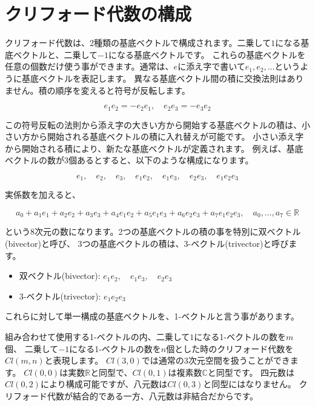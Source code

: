 \documentclass[a4paper,12pt,notitlepage]{jsreport}
\begin{document}
\section{クリフォード代数の構成}

クリフォード代数は、2種類の基底ベクトルで構成されます。二乗して$1$になる基底ベクトルと、二乗して$-1$になる基底ベクトルです。
これらの基底ベクトルを任意の個数だけ使う事ができます。通常は、$e$に添え字で書いて$e_1, e_2, ...$というように基底ベクトルを表記します。
異なる基底ベクトル間の積に交換法則はありません。積の順序を変えると符号が反転します。

\begin{equation}
  e_1e_2=-e_2e_1,\quad e_2e_3=-e_3e_2
\end{equation}

この符号反転の法則から添え字の大きい方から開始する基底ベクトルの積は、小さい方から開始される基底ベクトルの積に入れ替えが可能です。
小さい添え字から開始される積により、新たな基底ベクトルが定義されます。
例えば、基底ベクトルの数が3個あるとすると、以下のような構成になります。

\begin{equation}
  e_1,\quad e_2,\quad e_3,\quad e_1e_2,\quad e_1e_3,\quad e_2e_3,\quad e_1e_2e_3
\end{equation}

実係数を加えると、

\begin{equation}
  a_0+a_1e_1+a_2e_2+a_3e_3+a_4e_1e_2+a_5e_1e_3+a_6e_2e_3+a_7e_1e_2e_3,\quad a_0,..., a_7\in\mathbb{R}
\end{equation}

という8次元の数になります。2つの基底ベクトルの積の事を特別に双ベクトル(bivector)と呼び、
3つの基底ベクトルの積は、3-ベクトル(trivector)と呼びます。

\begin{itemize}
  \item 双ベクトル(bivector): $e_1e_2,\quad e_1e_3,\quad e_2e_3$
  \item 3-ベクトル(trivector): $e_1e_2e_3$
\end{itemize}
これらに対して単一構成の基底ベクトルを、1-ベクトルと言う事があります。

組み合わせて使用する1-ベクトルの内、二乗して$1$になる1-ベクトルの数を$m$個、
二乗して$-1$になる1-ベクトルの数を$n$個とした時のクリフォード代数を$Cl(m,n)$と表現します。
$Cl(3,0)$では通常の3次元空間を扱うことができます。
$Cl(0,0)$は実数$\mathbb{R}$と同型で、$Cl(0,1)$は複素数$\mathbb{C}$と同型です。
四元数は$Cl(0,2)$により構成可能ですが、八元数は$Cl(0,3)$と同型にはなりません。
クリフォード代数が結合的である一方、八元数は非結合だからです。
\end{document}
